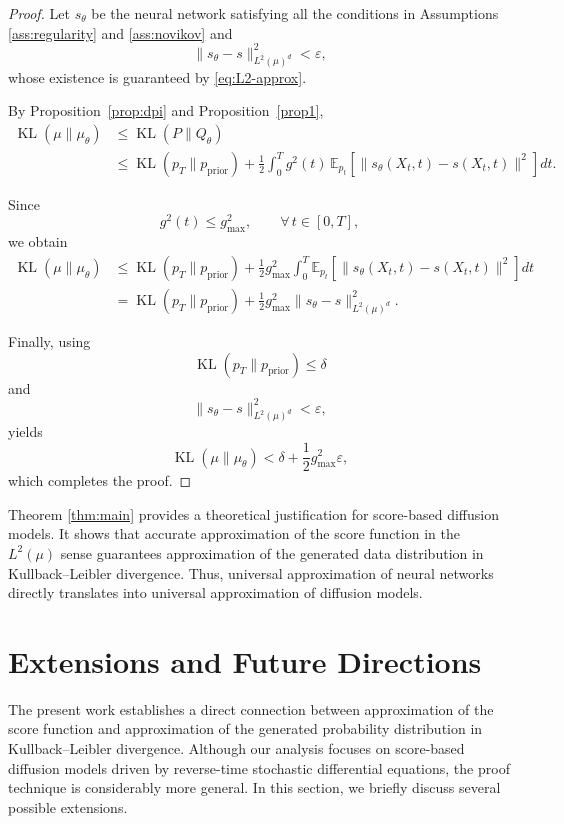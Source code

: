 \documentclass[11pt]{article}
\DeclareMathOperator{\KL}{KL}
\begin{document}
\begin{proof}

Let $s_\theta$ be the neural network satisfying all the conditions in Assumptions \ref{ass:regularity} and \ref{ass:novikov} and 
\[
\|s_\theta-s\|_{L^2(\mu)^d}^2
<
\varepsilon,
\]
whose existence is guaranteed by \eqref{eq:L2-approx}.

By Proposition~\ref{prop:dpi} and Proposition~\ref{prop1},
\begin{align}
\KL(\mu\|\mu_\theta)
&\le
\KL(P\|Q_\theta)
\nonumber \\
&\le
\KL(p_T\|p_{\mathrm{prior}})
+
\frac12
\int_0^T
g^2(t)
\,
\mathbb E_{p_t}
\!\left[
\|s_\theta(X_t,t)-s(X_t,t)\|^2
\right]
dt.
\end{align}


Since
\[
g^2(t)\le g_{\max}^2,
\qquad
\forall\,t\in[0,T],
\]
we obtain
\begin{align}
\KL(\mu\|\mu_\theta)
&\le
\KL(p_T\|p_{\mathrm{prior}})
+
\frac12
g_{\max}^2
\int_0^T
\mathbb E_{p_t}
\!\left[
\|s_\theta(X_t,t)-s(X_t,t)\|^2
\right]
dt
\nonumber \\
&=
\KL(p_T\|p_{\mathrm{prior}})
+
\frac12
g_{\max}^2
\|s_\theta-s\|_{L^2(\mu)^d}^2.
\end{align}


Finally, using
\[
\KL(p_T\|p_{\mathrm{prior}})
\le
\delta
\]
and
\[
\|s_\theta-s\|_{L^2(\mu)^d}^2
<
\varepsilon,
\]
yields
\[
\KL(\mu\|\mu_\theta)
<
\delta
+
\frac12
g_{\max}^2
\varepsilon,
\]
which completes the proof.

\end{proof}
Theorem \ref{thm:main} provides a theoretical justification for score-based diffusion models. It shows that accurate approximation of the score function in the $L^2(\mu)$ sense guarantees approximation of the generated data distribution in Kullback–Leibler divergence. Thus, universal approximation of neural networks directly translates into universal approximation of diffusion models.

\section{Extensions and Future Directions}

The present work establishes a direct connection between approximation of the score function and approximation of the generated probability distribution in Kullback--Leibler divergence. Although our analysis focuses on score-based diffusion models driven by reverse-time stochastic differential equations, the proof technique is considerably more general. In this section, we briefly discuss several possible extensions.
\end{document}
